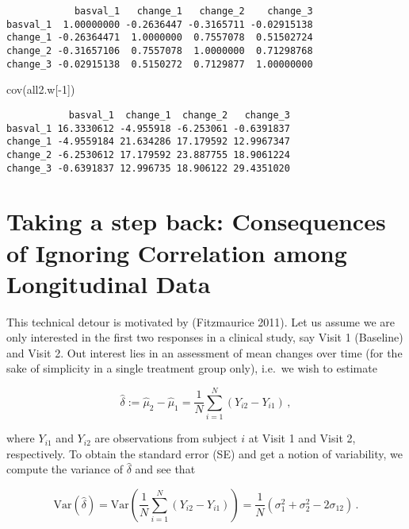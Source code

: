 \documentclass[
  letterpaper,
  DIV=11,
  numbers=noendperiod]{scrreprt}
\newenvironment{Shaded}{\begin{snugshade}}{\end{snugshade}}
\newcommand{\DecValTok}[1]{\textcolor[rgb]{0.68,0.00,0.00}{#1}}
\newcommand{\FunctionTok}[1]{\textcolor[rgb]{0.28,0.35,0.67}{#1}}
\newcommand{\NormalTok}[1]{\textcolor[rgb]{0.00,0.23,0.31}{#1}}
\newcommand{\SpecialCharTok}[1]{\textcolor[rgb]{0.37,0.37,0.37}{#1}}
\begin{document}
\begin{verbatim}
            basval_1   change_1   change_2    change_3
basval_1  1.00000000 -0.2636447 -0.3165711 -0.02915138
change_1 -0.26364471  1.0000000  0.7557078  0.51502724
change_2 -0.31657106  0.7557078  1.0000000  0.71298768
change_3 -0.02915138  0.5150272  0.7129877  1.00000000
\end{verbatim}

\begin{Shaded}
\begin{Highlighting}[]
\FunctionTok{cov}\NormalTok{(all2.w[}\SpecialCharTok{{-}}\DecValTok{1}\NormalTok{])}
\end{Highlighting}
\end{Shaded}

\begin{verbatim}
           basval_1  change_1  change_2   change_3
basval_1 16.3330612 -4.955918 -6.253061 -0.6391837
change_1 -4.9559184 21.634286 17.179592 12.9967347
change_2 -6.2530612 17.179592 23.887755 18.9061224
change_3 -0.6391837 12.996735 18.906122 29.4351020
\end{verbatim}

\hypertarget{taking-a-step-back-consequences-of-ignoring-correlation-among-longitudinal-data}{%
\section{Taking a step back: Consequences of Ignoring Correlation among
Longitudinal
Data}\label{taking-a-step-back-consequences-of-ignoring-correlation-among-longitudinal-data}}

This technical detour is motivated by (Fitzmaurice 2011). Let us assume
we are only interested in the first two responses in a clinical study,
say Visit 1 (Baseline) and Visit 2. Out interest lies in an assessment
of mean changes over time (for the sake of simplicity in a single
treatment group only), i.e.~we wish to estimate

\[
\hat\delta := \hat\mu_2 - \hat\mu_1 = \frac{1}{N} \sum_{i=1}^N (Y_{i2} - Y_{i1})\,,
\]

where \(Y_{i1}\) and \(Y_{i2}\) are observations from subject \(i\) at
Visit 1 and Visit 2, respectively. To obtain the standard error (SE) and
get a notion of variability, we compute the variance of \(\hat\delta\)
and see that

\[
\text{Var}(\hat\delta) = \text{Var}\left(\frac{1}{N} \sum_{i=1}^N (Y_{i2} - Y_{i1})\right) = \frac{1}{N} (\sigma_1^2 + \sigma_2^2 - 2\sigma_{12})\,.
\]
\end{document}
